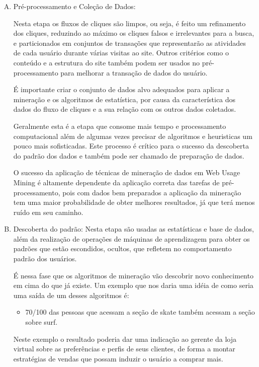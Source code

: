 \begin{enumerate}[A)]
\item Pré-processamento e Coleção de Dados:

	 Nesta etapa os fluxos de cliques são limpos, ou seja, é feito um refinamento dos cliques, reduzindo ao máximo os cliques falsos e irrelevantes para a busca, e particionados em conjuntos de transações que representarão as atividades de cada usuário durante várias visitas ao site. Outros critérios como o conteúdo e a estrutura do site também podem ser usados no pré-processamento para melhorar a transação de dados do usuário.

	É importante criar o conjunto de dados alvo adequados para aplicar a mineração e os algoritmos de estatística, por causa da característica dos dados do fluxo de cliques e a sua relação com os outros dados coletados.

	Geralmente esta é a etapa que consome mais tempo e processamento computacional além de  algumas vezes precisar de algoritmos e heuristicas um pouco mais sofisticadas. Este processo é crítico para o sucesso da descoberta do padrão dos dados e também pode ser chamado de preparação de dados.

	O sucesso da aplicação de técnicas de mineração de dados em Web Usage Mining é altamente dependente da aplicação correta das tarefas de pré-processamento, pois com dados bem preparados a aplicação da mineração tem uma maior probabilidade de obter melhores resultados, já que terá menos ruído em seu caminho.

\item Descoberta do padrão:
	Nesta etapa são usadas as estatísticas e base de dados, além da realização de operações de máquinas de aprendizagem para obter os padrões que estão escondidos, ocultos, que refletem no comportamento padrão dos usuários.

    É nessa fase que os algoritmos de mineração vão descobrir novo conhecimento em cima do que já existe. Um exemplo que nos daria uma idéia de como seria uma saída de um desses algoritmos é:
    \begin{itemize}
    \item 70/100 das pessoas que acessam a seção de skate também acessam a seção sobre surf.
    \end{itemize}
    Neste exemplo o resultado poderia dar uma indicação ao gerente da loja virtual sobre as preferências e perfis de seus clientes, de forma a montar estratégias de vendas que possam induzir o usuário a comprar mais.


\end{enumerate}
